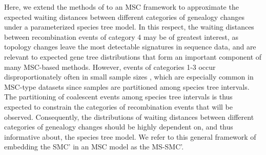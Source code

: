 \documentclass[11pt]{article}
\begin{document}






Here, we extend the methods of \citet{deng_distribution_2021} to an MSC framework
to approximate the expected waiting distances between different categories of 
genealogy changes under a parameterized species tree model. In this respect, 
the waiting distances between recombination events of category 4 may be of greatest 
interest, as topology changes leave the most detectable signatures in sequence data, 
and are relevant to expected gene tree distributions that form an important 
component of many MSC-based methods.
However, events of categories 1-3 occur 
disproportionately often in small sample sizes \citep{wilton2015smc}, 
which are especially common in MSC-type datasets since
samples are partitioned among species tree intervals. The partitioning of 
coalescent events among species tree intervals is thus expected to constrain 
the categories of recombination events that will be observed. Consequently, the
distributions of waiting distances between different categories of 
genealogy changes should be highly dependent on, and thus informative about, 
the species tree model. We refer to this general framework of embedding the 
SMC' in an MSC model as the MS-SMC'.
\end{document}
